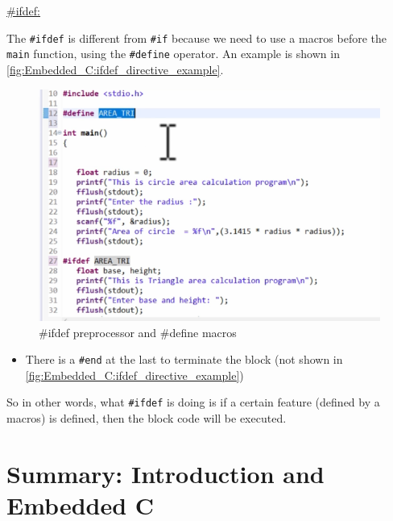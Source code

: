 \underline{\#ifdef:}

The \verb|#ifdef| is different from \verb|#if| because we need to use a macros before the \verb|main| function, using the \verb|#define| operator. An example is shown in \autoref{fig:Embedded_C:ifdef_directive_example}.


\begin{figure}[h]
\centering
\includegraphics[scale=0.55]{Figures/Embedded_C/ifdef_directive_example}
\caption{\#ifdef preprocessor and \#define macros}
\label{fig:Embedded_C:ifdef_directive_example}
\end{figure}

\begin{itemize}
    \item There is a \verb|#end| at the last to terminate the block (not shown in \autoref{fig:Embedded_C:ifdef_directive_example})
\end{itemize}

So in other words, what \verb|#ifdef| is doing is if a certain feature (defined by a macros) is defined, then the block code will be executed.


\newpage
\section{Summary: Introduction and Embedded C}

